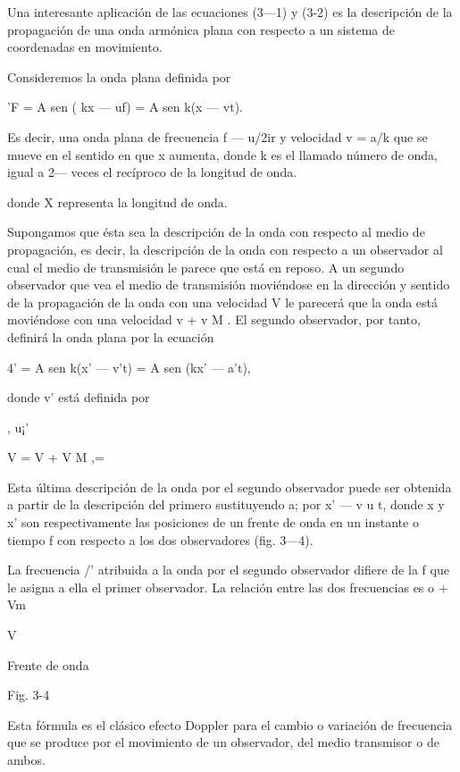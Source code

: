 Una interesante aplicación de las ecuaciones (3—1) y (3-2) es la descripción de la propagación de una onda armónica plana con respecto a un sistema de coordenadas en movimiento. 

Consideremos la onda plana definida por 

'F = A sen ( kx — uf) = A sen k(x — vt). 

Es decir, una onda plana de frecuencia f — u/2ir y velocidad v = a/k que se mueve en el sentido en que x aumenta, donde k es el llamado número de onda, igual a 2— veces el recíproco de la longitud de onda. 

donde X representa la longitud de onda. 

Supongamos que ésta sea la descripción de la onda con respecto al medio de propagación, es decir, la descripción de la onda con respecto a un observador al cual el medio de transmisión le parece que está en reposo. A un segundo observador que vea el medio de transmisión moviéndose en la dirección y sentido de la propagación de la onda con una velocidad V le parecerá que la onda está moviéndose con una velocidad v + v M . El segundo observador, por tanto, definirá la onda plana por la ecuación 

4' = A sen k(x' — v't) = A sen (kx' — a’t), 

donde v' está definida por 

, u¡' 

V = V + V M ,= 

Esta última descripción de la onda por el segundo observador puede ser obtenida a partir de la descripción del primero sustituyendo a; por x' — v u t, donde x y x' son respectivamente las posiciones de un frente de onda en un instante o tiempo f con respecto a los dos observadores (fig. 3—4). 

La frecuencia /' atribuida a la onda por el segundo observador difiere de la f que le asigna a ella el primer observador. La relación entre las dos frecuencias es 
o + Vm 

V 

Frente de onda 

Fig. 3-4 

Esta fórmula es el clásico efecto Doppler para el cambio o variación de frecuencia que se produce por el movimiento de un observador, del medio transmisor o de ambos. 